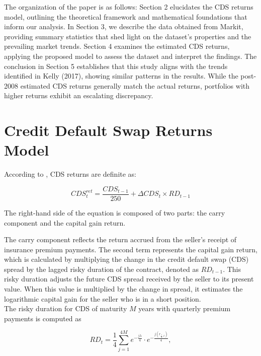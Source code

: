 \documentclass{article}
\begin{document}
The organization of the paper is as follows: Section 2 elucidates the CDS returns model, outlining the theoretical framework and mathematical foundations that inform our analysis. In Section 3, we describe the data obtained from Markit, providing summary statistics that shed light on the dataset's properties and the prevailing market trends. Section 4 examines the estimated CDS returns, applying the proposed model to assess the dataset and interpret the findings. The conclusion in Section 5 establishes that this study aligns with the trends identified in Kelly (2017), showing similar patterns in the results. While the post-2008 estimated CDS returns generally match the actual returns, portfolios with higher returns exhibit an escalating discrepancy.


\section{Credit Default Swap Returns Model}

According to  \cite{Palhares2013}, CDS returns are definite as:

\begin{equation}
    CDS_{t}^{ret} = \frac{CDS_{t-1}}{250} + \Delta CDS_{t} \times RD_{t-1}
\end{equation}

The right-hand side of the equation is composed of two parts: the carry component and the capital gain return. \

The carry component reflects the return accrued from the seller’s receipt of insurance premium payments. The second term represents the capital gain return, which is calculated by multiplying the change in the credit default swap (CDS) spread by the lagged risky duration of the contract, denoted as \( RD_{t-1} \). This risky duration adjusts the future CDS spread received by the seller to its present value. When this value is multiplied by the change in spread, it estimates the logarithmic capital gain for the seller who is in a short position.\\

The risky duration for CDS of maturity $M$ years with quarterly premium payments is computed as


\begin{equation}
RD_t = \frac{1}{4} \sum_{j=1}^{4M} e^{-\frac{j\lambda}{4}} \cdot e^{-\frac{j(r_{\frac{j}{4}, t})}{4}},
\end{equation}
\end{document}
